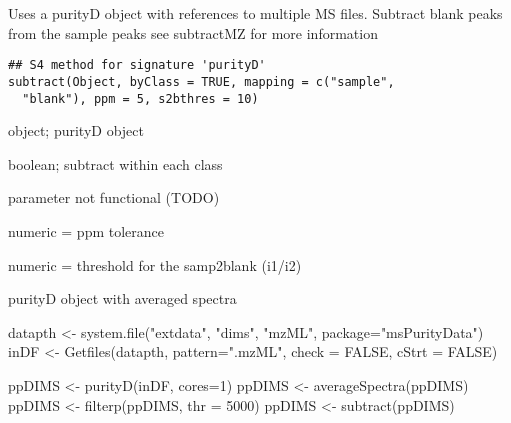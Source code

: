 \documentclass[letterpaper]{book}
\begin{document}
%
\begin{Description}\relax
Uses a purityD object with references to multiple MS files. Subtract blank peaks from the sample peaks
see subtractMZ for more information
\end{Description}
%
\begin{Usage}
\begin{verbatim}
## S4 method for signature 'purityD'
subtract(Object, byClass = TRUE, mapping = c("sample",
  "blank"), ppm = 5, s2bthres = 10)
\end{verbatim}
\end{Usage}
%
\begin{Arguments}
\begin{ldescription}
\item[\code{Object}] object; purityD object

\item[\code{byClass}] boolean; subtract within each class

\item[\code{mapping}] parameter not functional (TODO)

\item[\code{ppm}] numeric = ppm tolerance

\item[\code{s2bthres}] numeric = threshold for the samp2blank (i1/i2)
\end{ldescription}
\end{Arguments}
%
\begin{Value}
purityD object with averaged spectra
\end{Value}
%
\begin{SeeAlso}\relax
{}
\end{SeeAlso}
%
\begin{Examples}
\begin{ExampleCode}
datapth <- system.file("extdata", "dims", "mzML", package="msPurityData")
inDF <- Getfiles(datapth, pattern=".mzML", check = FALSE, cStrt = FALSE)

ppDIMS <- purityD(inDF, cores=1)
ppDIMS <- averageSpectra(ppDIMS)
ppDIMS <- filterp(ppDIMS, thr = 5000)
ppDIMS <- subtract(ppDIMS)
\end{ExampleCode}
\end{Examples}
\end{document}
